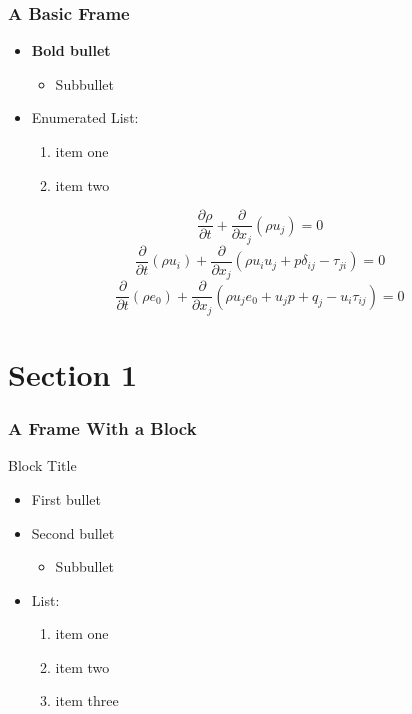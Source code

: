 \documentclass[aspectratio=1610]{beamer}
\begin{document}
\begin{frame}
  \frametitle{A Basic Frame}

  \begin{itemize}
  \item \textbf{Bold bullet}
    \begin{itemize}
    \item Subbullet
    \end{itemize}
  \item Enumerated List:
    \begin{enumerate}
    \item item one
    \item item two
    \end{enumerate}
  \end{itemize}
  \begin{equation}
    \frac{\partial \rho}{\partial t} +
    \frac{\partial}{\partial x_{j}} (\rho u_{j}) = 0
  \end{equation}
  \begin{equation}
    \frac{\partial}{\partial t} (\rho u_{i}) +
    \frac{\partial}{\partial x_{j}} (\rho u_{i} u_{j} + p \delta_{ij} - \tau_{ji} )
    = 0
  \end{equation}
  \begin{equation}
    \frac{\partial}{\partial t} ( \rho e_{0} ) +
    \frac{\partial}{\partial x_{j}}
    ( \rho u_{j} e_{0} + u_{j} p + q_{j} - u_{i} \tau_{ij} ) = 0
  \end{equation}
\end{frame}

\section{Section 1}
\begin{frame}
  \frametitle{A Frame With a Block}
  \begin{block}{Block Title}
  \begin{itemize}
  \item First bullet
  \item Second bullet
    \begin{itemize}
    \item Subbullet
    \end{itemize}
  \item List:
    \begin{enumerate}
    \item item one
    \item item two
    \item item three
    \end{enumerate}
  \end{itemize}
  \end{block}
\end{frame}
\end{document}
